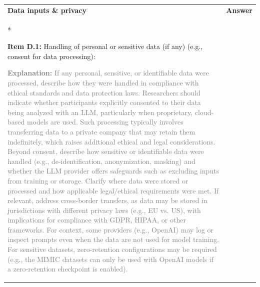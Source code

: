 \documentclass[12pt]{article}
\begin{document}
\begin{longtable}{|p{}|p{}|}
\hline
\rowcolor{green!20}
\textbf{{Data inputs \& privacy}} & \textbf{Answer} \\*   %
\hline

\textbf{Item D.1:} Handling of personal or sensitive data (if any) (e.g., consent for data processing):

\textcolor{gray}{{\footnotesize
\textbf{Explanation:} If any personal, sensitive, or identifiable data were processed, describe how they were handled in compliance with ethical standards and data protection laws. Researchers should indicate whether participants explicitly consented to their data being analyzed with an LLM, particularly when proprietary, cloud-based models are used. Such processing typically involves transferring data to a private company that may retain them indefinitely, which raises additional ethical and legal considerations. Beyond consent, describe how sensitive or identifiable data were handled (e.g., de-identification, anonymization, masking) and whether the LLM provider offers safeguards such as excluding inputs from training or storage. Clarify where data were stored or processed and how applicable legal/ethical requirements were met. If relevant, address cross-border transfers, as data may be stored in jurisdictions with different privacy laws (e.g., EU vs. US), with implications for compliance with GDPR, HIPAA, or other frameworks.
For context, some providers (e.g., OpenAI) may log or inspect prompts even when the data are not used for model training. For sensitive datasets, zero-retention configurations may be required (e.g., the MIMIC datasets can only be used with OpenAI models if a zero-retention checkpoint is enabled).
}}
&   \\
\hline
\end{longtable}
\end{document}
